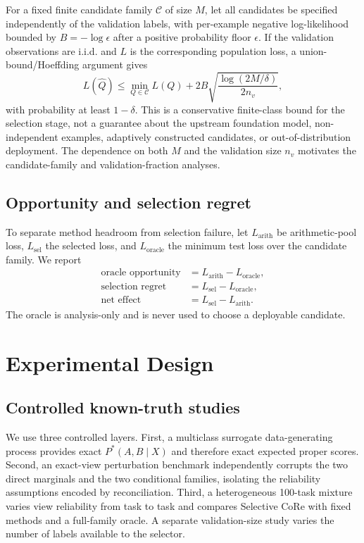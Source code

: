 \documentclass[a4paper,fleqn]{cas-sc}
\newcommand{\Cset}{\mathcal{C}}
\begin{document}
For a fixed finite candidate family $\Cset$ of size $M$, let all candidates be specified independently of the validation labels, with per-example negative log-likelihood bounded by $B=-\log\epsilon$ after a positive probability floor $\epsilon$. If the validation observations are i.i.d. and $L$ is the corresponding population loss, a union-bound/Hoeffding argument gives
\begin{equation}
L(\hat Q)\le\min_{Q\in\Cset}L(Q)+2B\sqrt{\frac{\log(2M/\delta)}{2n_v}},
\end{equation}
with probability at least $1-\delta$. This is a conservative finite-class bound for the selection stage, not a guarantee about the upstream foundation model, non-independent examples, adaptively constructed candidates, or out-of-distribution deployment. The dependence on both $M$ and the validation size $n_v$ motivates the candidate-family and validation-fraction analyses.

\subsection{Opportunity and selection regret}
To separate method headroom from selection failure, let $L_{\mathrm{arith}}$ be arithmetic-pool loss, $L_{\mathrm{sel}}$ the selected loss, and $L_{\mathrm{oracle}}$ the minimum test loss over the candidate family. We report
\begin{align}
\text{oracle opportunity} &= L_{\mathrm{arith}}-L_{\mathrm{oracle}},\\
\text{selection regret} &= L_{\mathrm{sel}}-L_{\mathrm{oracle}},\\
\text{net effect} &= L_{\mathrm{sel}}-L_{\mathrm{arith}}.
\end{align}
The oracle is analysis-only and is never used to choose a deployable candidate.

\section{Experimental Design}
\subsection{Controlled known-truth studies}
We use three controlled layers. First, a multiclass surrogate data-generating process provides exact $P^*(A,B\mid X)$ and therefore exact expected proper scores. Second, an exact-view perturbation benchmark independently corrupts the two direct marginals and the two conditional families, isolating the reliability assumptions encoded by reconciliation. Third, a heterogeneous 100-task mixture varies view reliability from task to task and compares Selective CoRe with fixed methods and a full-family oracle. A separate validation-size study varies the number of labels available to the selector.
\end{document}
